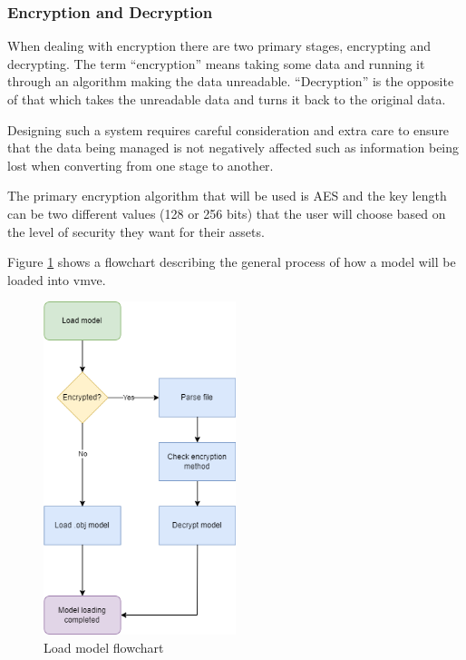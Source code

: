 \documentclass[11pt]{article}
\begin{document}
\subsubsection{Encryption and Decryption}
When dealing with encryption there are two primary stages, encrypting and
decrypting. The term ``encryption'' means taking some data and running it
through an algorithm making the data unreadable. ``Decryption'' is the opposite
of that which takes the unreadable data and turns it back to the original data.

Designing such a system requires careful consideration and extra care to ensure
that the data being managed is not negatively affected such as information being
lost when converting from one stage to another.

The primary encryption algorithm that will be used is AES and the key length can
be two different values (128 or 256 bits) that the user will choose based on the
level of security they want for their assets.

Figure \ref{fig:load_model_flowchart} shows a flowchart describing the general
process of how a model will be loaded into \gls*{vmve}.

\begin{figure}[H]
  \centering
  \includegraphics[width=0.5\textwidth]{images/load_model_flowchart.png}
  \caption{Load model flowchart}
  \label{fig:load_model_flowchart}
\end{figure}
\end{document}
